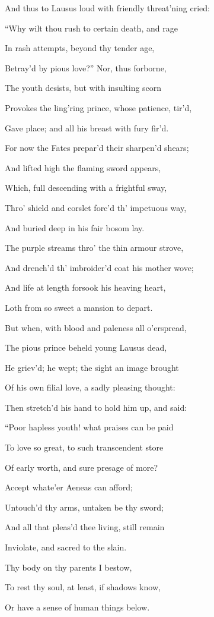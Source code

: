 And thus to Lausus loud with friendly threat’ning cried:

“Why wilt thou rush to certain death, and rage

In rash attempts, beyond thy tender age,

Betray’d by pious love?” Nor, thus forborne,

The youth desists, but with insulting scorn

Provokes the ling’ring prince, whose patience, tir’d,

Gave place; and all his breast with fury fir’d.

For now the Fates prepar’d their sharpen’d shears;

And lifted high the flaming sword appears,

Which, full descending with a frightful sway,

Thro’ shield and corslet forc’d th’ impetuous way,

And buried deep in his fair bosom lay.

The purple streams thro’ the thin armour strove,

And drench’d th’ imbroider’d coat his mother wove;

And life at length forsook his heaving heart,

Loth from so sweet a mansion to depart.

But when, with blood and paleness all o’erspread,

The pious prince beheld young Lausus dead,

He griev’d; he wept; the sight an image brought

Of his own filial love, a sadly pleasing thought:

Then stretch’d his hand to hold him up, and said:

“Poor hapless youth! what praises can be paid

To love so great, to such transcendent store

Of early worth, and sure presage of more?

Accept whate’er Aeneas can afford;

Untouch’d thy arms, untaken be thy sword;

And all that pleas’d thee living, still remain

Inviolate, and sacred to the slain.

Thy body on thy parents I bestow,

To rest thy soul, at least, if shadows know,

Or have a sense of human things below.

